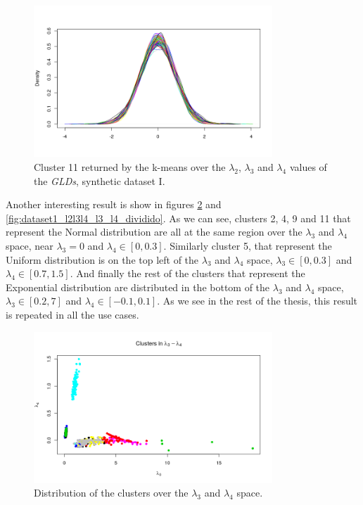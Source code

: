 \begin{figure}[H]
    \centering
    \includegraphics[width=0.8\textwidth]{img/gld_clustering/Dataset1/l2_l3_l4/intento_3/cluster11.png}
    \caption{Cluster 11 returned by the k-means over the $\lambda_{2}$, $\lambda_{3}$ and $\lambda_{4}$ values of the \textit{GLDs}, synthetic dataset I.}
    \label{fig:dataset1_l2l3l4_cl11}
\end{figure}

Another interesting result is show in figures \ref{fig:dataset1_l2l3l4_l3_l4} and \ref{fig:dataset1_l2l3l4_l3_l4_dividido}. As we can see, clusters 2, 4, 9 and 11 that represent the Normal distribution are all at the same region over the $\lambda_{3}$ and $\lambda_{4}$ space, near $\lambda_{3} = 0$ and $\lambda_{4} \in [0, 0.3]$. Similarly cluster 5, that represent the Uniform distribution is on the top left of the $\lambda_{3}$ and $\lambda_{4}$ space, $\lambda_{3} \in [0, 0.3]$ and $\lambda_{4} \in [0.7, 1.5]$. And finally the rest of the clusters that represent the Exponential distribution are distributed in the bottom of the $\lambda_{3}$ and $\lambda_{4}$ space, $\lambda_{3} \in [0.2, 7]$ and $\lambda_{4} \in [-0.1, 0.1]$. As we see in the rest of the thesis, this result is repeated in all the use cases.

\begin{figure}[H]
    \centering
    \includegraphics[width=0.8\textwidth]{img/gld_clustering/Dataset1/l2_l3_l4/intento_3/l3_l4.png}
    \caption{Distribution of the clusters over the $\lambda_{3}$ and $\lambda_{4}$ space.}
    \label{fig:dataset1_l2l3l4_l3_l4}
\end{figure}

